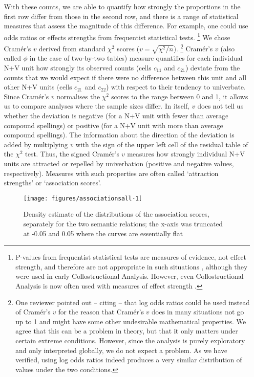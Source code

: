 \documentclass[biblatex, charis, linguex]{glossa}\usepackage{knitr}
\begin{document}
With these counts, we are able to quantify how strongly the proportions in the first row differ from those in the second row, and there is a range of statistical measures that assess the magnitude of this difference.
For example, one could use odds ratios or effects strengths from frequentist statistical tests.%
\footnote{P-values from frequentist statistical tests are measures of evidence, not effect strength, and therefore are not appropriate in such situations \parencite{SchmidKuechenhoff2013,KuechenhoffSchmid2015}, although they were used in early Collostructional Analysis.
However, even Collostructional Analysis is now often used with measures of effect strength \parencite{Gries2015b}.}
We chose Cramér's $v$ derived from standard $\chi^2$ scores ($v=\sqrt{\chi^2/n}$).%
\footnote{\label{fn:cramer}One reviewer pointed out -- citing \mbox{\citet{Gries2022}} -- that log odds ratios could be used instead of Cramér's $v$ for the reason that Cramér's $v$ does in many situations not go up to 1 and might have some other undesirable mathematical properties.
We agree that this can be a problem in theory, but that it only matters under certain extreme conditions.
However, since the analysis is purely exploratory and only interpreted globally, we do not expect a problem.
As we have verified, using log odds ratios indeed produces a very similar distribution of values under the two conditions.}
Cramér's $v$ (also called $\phi$ in the case of two-by-two tables) measure quantifies for each individual N+V unit how strongly its observed counts (cells $c_{11}$ and $c_{21}$) deviate from the counts that we would expect if there were no difference between this unit and all other N+V units (cells $c_{21}$ and $c_{22}$) with respect to their tendency to univerbate.
Since Cramér's $v$ normalises the $\chi^2$ scores to the range between 0 and 1, it allows us to compare analyses where the sample sizes differ.
In itself, $v$ does not tell us whether the deviation is negative (for a N+V unit with fewer than average compound spellings) or positive (for a N+V unit with more than average compound spellings).
The information about the direction of the deviation is added by multiplying $v$ with the sign of the upper left cell of the residual table of the $\chi^2$ test.
Thus, the signed Cramér's $v$ measures how strongly individual N+V units are attracted or repelled by univerbation (positive and negative values, respectively).
Measures with such properties are often called `attraction strengths' or `association scores'.

\begin{figure}[htbp]

{\centering \texttt{[image: figures/associationsall-1]} 

}

\caption[Density estimate of the distributions of the association scores, separately for the two semantic relations]{Density estimate of the distributions of the association scores, separately for the two semantic relations; the x-axis was truncated at -0.05 and 0.05 where the curves are essentially flat}\label{fig:associationsall}
\end{figure}
\end{document}

